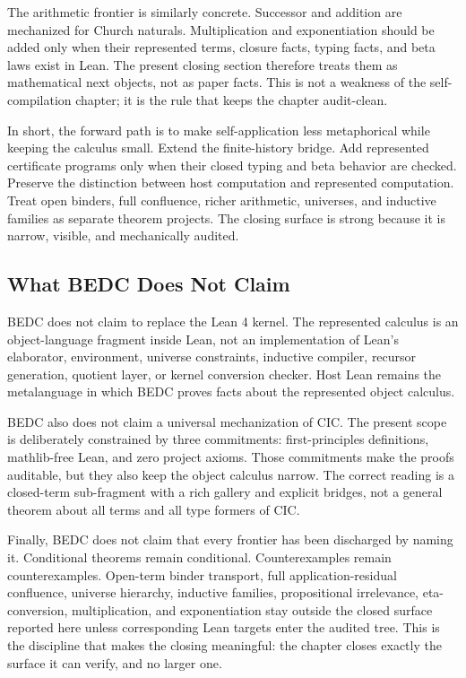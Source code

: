 The arithmetic frontier is similarly concrete.  Successor and addition are
mechanized for Church naturals.  Multiplication and exponentiation should be
added only when their represented terms, closure facts, typing facts, and
beta laws exist in Lean.  The present closing section therefore treats them
as mathematical next objects, not as paper facts.  This is not a weakness of
the self-compilation chapter; it is the rule that keeps the chapter
audit-clean.

In short, the forward path is to make self-application less metaphorical while
keeping the calculus small.  Extend the finite-history bridge.  Add
represented certificate programs only when their closed typing and beta
behavior are checked.  Preserve the distinction between host computation and
represented computation.  Treat open binders, full confluence, richer
arithmetic, universes, and inductive families as separate theorem projects.
The closing surface is strong because it is narrow, visible, and mechanically
audited.

\subsection{What BEDC Does Not Claim}
\label{subsec:session-closing-not-claimed}

BEDC does not claim to replace the Lean 4 kernel.  The represented calculus is
an object-language fragment inside Lean, not an implementation of Lean's
elaborator, environment, universe constraints, inductive compiler, recursor
generation, quotient layer, or kernel conversion checker.  Host Lean remains
the metalanguage in which BEDC proves facts about the represented object
calculus.

BEDC also does not claim a universal mechanization of CIC.  The present scope
is deliberately constrained by three commitments: first-principles definitions,
mathlib-free Lean, and zero project axioms.  Those commitments make the proofs
auditable, but they also keep the object calculus narrow.  The correct reading
is a closed-term sub-fragment with a rich gallery and explicit bridges, not a
general theorem about all terms and all type formers of CIC.

Finally, BEDC does not claim that every frontier has been discharged by naming
it.  Conditional theorems remain conditional.  Counterexamples remain
counterexamples.  Open-term binder transport, full application-residual
confluence, universe hierarchy, inductive families, propositional
irrelevance, eta-conversion, multiplication, and exponentiation stay outside
the closed surface reported here unless corresponding Lean targets enter the
audited tree.  This is the discipline that makes the closing meaningful: the
chapter closes exactly the surface it can verify, and no larger one.
